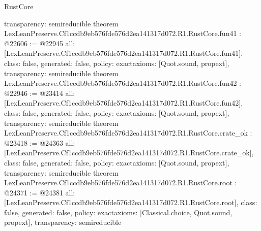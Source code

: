 \begin{lexlean}{RustCore}
\begin{coremodule}
{  transparency: semireducible
}
theorem LexLeanPreserve.Cf1ccdb9eb576fde576d2ea141317d072.R1.RustCore.fun41 : @22606 := @22945 {
  all: [LexLeanPreserve.Cf1ccdb9eb576fde576d2ea141317d072.R1.RustCore.fun41],
  class: false,
  generated: false,
  policy: exact{axioms: [Quot.sound, propext]},
  transparency: semireducible
}
theorem LexLeanPreserve.Cf1ccdb9eb576fde576d2ea141317d072.R1.RustCore.fun42 : @22946 := @23414 {
  all: [LexLeanPreserve.Cf1ccdb9eb576fde576d2ea141317d072.R1.RustCore.fun42],
  class: false,
  generated: false,
  policy: exact{axioms: [Quot.sound, propext]},
  transparency: semireducible
}
theorem LexLeanPreserve.Cf1ccdb9eb576fde576d2ea141317d072.R1.RustCore.crate_ok : @23418 := @24363 {
  all: [LexLeanPreserve.Cf1ccdb9eb576fde576d2ea141317d072.R1.RustCore.crate_ok],
  class: false,
  generated: false,
  policy: exact{axioms: [Quot.sound, propext]},
  transparency: semireducible
}
theorem LexLeanPreserve.Cf1ccdb9eb576fde576d2ea141317d072.R1.RustCore.root : @24371 := @24381 {
  all: [LexLeanPreserve.Cf1ccdb9eb576fde576d2ea141317d072.R1.RustCore.root],
  class: false,
  generated: false,
  policy: exact{axioms: [Classical.choice, Quot.sound, propext]},
  transparency: semireducible
}


\end{coremodule}
\end{lexlean}
